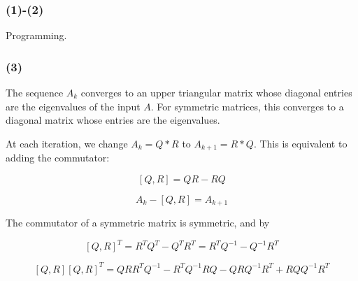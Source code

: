 \documentclass{article}
\begin{document}
\subsubsection{(1)-(2)} Programming.

\subsubsection{(3)} The sequence $A_k$ converges to an upper triangular matrix whose diagonal entries are the eigenvalues of the input $A$. For symmetric matrices, this converges to a diagonal matrix whose entries are the eigenvalues.

At each iteration, we change $A_k = Q*R$ to $A_{k+1} = R*Q$. This is equivalent to adding the commutator: 

\[[Q,R] = QR - RQ\]

\[A_k - [Q,R] = A_{k+1} \]

The commutator of a symmetric matrix is symmetric, and by 


\[[Q,R]^T = R^TQ^T - Q^TR^T = R^TQ^{-1} - Q^{-1}R^T \]

\[[Q,R] [Q,R]^T = QRR^TQ^{-1} - R^TQ^{-1}RQ - QRQ^{-1}R^T + RQQ^{-1}R^T \]
\end{document}
